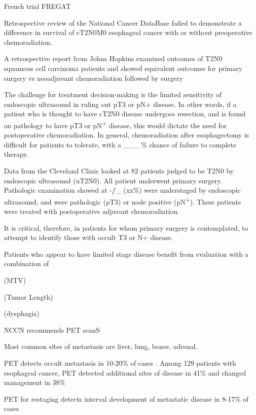 \documentclass[
]{book}
\begin{document}
French trial FREGAT\citep{markar59}

Retrospective review of the National Cancer DataBase failed to demonstrate a difference in survival of cT2N0M0 esophageal cancer with or without preoperative chemoradiation.\citep{speicher1195}

A retrospective report from Johns Hopkins examined outcomes of T2N0 squamous cell carcinoma patients and showed equivalent outcomes for primary surgery vs neoadjuvant chemoradiation followed by surgery \citep{zhang429}

The challenge for treatment decision-making is the limited sensitivity of endoscopic ultrasound in ruling out pT3 or pN+ disease. In other words, if a patient who is thought to have cT2N0 disease undergoes resection, and is found on pathology to have pT3 or pN\textsuperscript{+} disease, this would dictate the need for postoperative chemoradiation. In general, chemoradiation after esophagectomy is difficult for patients to tolerate, with a \_\_\_ \% chance of failure to complete therapy.

Data from the Cleveland Clinic looked at 82 patients judged to be T2N0 by endoscopic ultrasound (uT2N0). All patient underwent primary surgery. Pathologic examination showed at -\textbf{/}\_ (xx\%) were understaged by endoscopic ultrasound, and were pathologic (pT3) or node positive (pN\textsuperscript{+}). These patients were treated with postoperative adjuvant chemoradiation.\citep{rice}

It is critical, therefore, in patients for whom primary surgery is contemplated, to attempt to identify those with occult T3 or N+ disease.

Patients who appear to have limited stage disease benefit from evaluation with a combination of

(MTV)

(Tumor Length)

(dysphagia)

NCCN recommends PET scanS

Most common sites of metastasis are liver, lung, bones, adrenal.

PET detects occult metastasis in 10-20\% of cases \citep[\citet{kim403}]{kato921}. Among 129 patients with esophageal cancer, PET detected additional sites of disease in 41\% and changed management in 38\% \citep{chatterton354}

PET for restaging detects interval development of metastatic disease in 8-17\% of cases \citep{vanvliet547}
\end{document}
